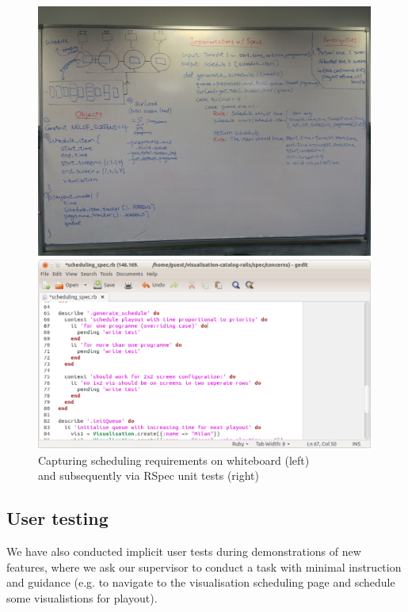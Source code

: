 \documentclass[a4paper]{article}
\begin{document}
\begin{figure}[H]
  \begin{minipage}{0.46\textwidth}
      \includegraphics[width = 0.99\textwidth, trim = 0 4.5cm 0 7cm, clip]{./evaluation/scheduling_whiteboard.jpg}
  \end{minipage}
  \begin{minipage}{0.53\textwidth}
      \includegraphics[width = 0.99\textwidth]{./evaluation/scheduling_spec.png}
  \end{minipage}
  \caption{Capturing scheduling requirements on whiteboard (left)\\ and subsequently via RSpec unit tests (right)}
 
\end{figure}

\subsection{User testing}
We have also conducted implicit user tests during demonstrations of new features,
where we ask our supervisor to conduct a task with minimal instruction and guidance
(e.g. to navigate to the visualisation scheduling page and schedule some visualistions
for playout).
\end{document}
